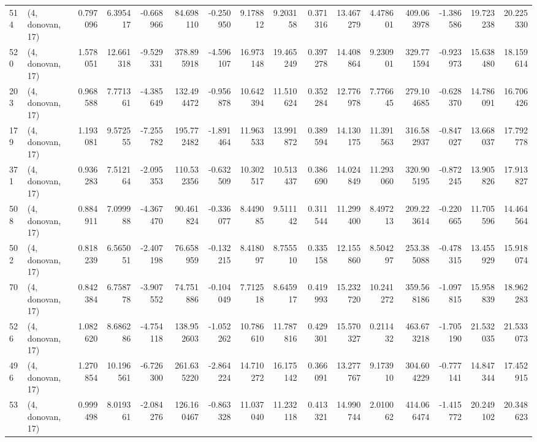 \begin{tabular}{llrrrrrrrrrrrrrr}
514 &  (4, donovan, 17) &   0.797096 &   6.395417 &  -0.668966 &    84.698110 &  -0.250950 &   9.178812 &   9.203158 &  0.371316 &  13.467279 &   4.478601 &   409.063978 & -1.386586 &  19.723238 &  20.225330 \\
520 &  (4, donovan, 17) &   1.578051 &  12.661318 &  -9.529331 &   378.895918 &  -4.596107 &  16.973148 &  19.465249 &  0.397278 &  14.408864 &   9.230901 &   329.771594 & -0.923973 &  15.638480 &  18.159614 \\
203 &  (4, donovan, 17) &   0.968588 &   7.771361 &  -4.385649 &   132.494472 &  -0.956878 &  10.642394 &  11.510624 &  0.352284 &  12.776978 &   7.776645 &   279.104685 & -0.628370 &  14.786091 &  16.706426 \\
179 &  (4, donovan, 17) &   1.193081 &   9.572555 &  -7.255782 &   195.772482 &  -1.891464 &  11.963533 &  13.991872 &  0.389594 &  14.130175 &  11.391563 &   316.582937 & -0.847027 &  13.668037 &  17.792778 \\
371 &  (4, donovan, 17) &   0.936283 &   7.512164 &  -2.095353 &   110.532356 &  -0.632509 &  10.302517 &  10.513437 &  0.386690 &  14.024849 &  11.293060 &   320.905195 & -0.872245 &  13.905826 &  17.913827 \\
508 &  (4, donovan, 17) &   0.884911 &   7.099988 &  -4.367470 &    90.461824 &  -0.336077 &   8.449085 &   9.511142 &  0.311544 &  11.299400 &   8.497213 &   209.223614 & -0.220665 &  11.705596 &  14.464564 \\
502 &  (4, donovan, 17) &   0.818239 &   6.565051 &  -2.407198 &    76.658959 &  -0.132215 &   8.418097 &   8.755510 &  0.335158 &  12.155860 &   8.504297 &   253.385088 & -0.478315 &  13.455929 &  15.918074 \\
70  &  (4, donovan, 17) &   0.842384 &   6.758778 &  -3.907552 &    74.751886 &  -0.104049 &   7.712518 &   8.645917 &  0.419993 &  15.232720 &  10.241272 &   359.568186 & -1.097815 &  15.958839 &  18.962283 \\
526 &  (4, donovan, 17) &   1.082620 &   8.686286 &  -4.754118 &   138.952603 &  -1.052262 &  10.786610 &  11.787816 &  0.429301 &  15.570327 &   0.211432 &   463.673218 & -1.705190 &  21.532035 &  21.533073 \\
496 &  (4, donovan, 17) &   1.270854 &  10.196561 &  -6.726300 &   261.635220 &  -2.864224 &  14.710272 &  16.175142 &  0.366091 &  13.277767 &   9.173910 &   304.604229 & -0.777141 &  14.847344 &  17.452915 \\
53  &  (4, donovan, 17) &   0.999498 &   8.019361 &  -2.084276 &   126.160467 &  -0.863328 &  11.037040 &  11.232118 &  0.413321 &  14.990744 &   2.010062 &   414.066474 & -1.415772 &  20.249102 &  20.348623 \\

\end{tabular}
